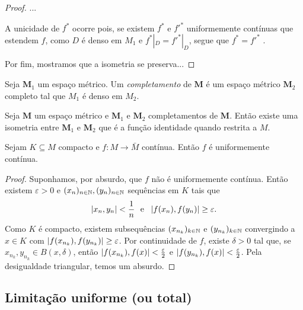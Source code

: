 \begin{proof}
...

	A unicidade de $f^*$ ocorre pois, se existem $f^*$ e $f'^*$ uniformemente contínuas que estendem $f$, como $D$ é denso em $M_1$ e $f^*|_D = f'^*|_D$, segue que $f^* = f'^*$ .

	Por fim, mostramos que a isometria se preserva...
\end{proof}

\begin{definition}
Seja $\bm M_1$  um espaço métrico. Um \emph{completamento} de $\bm M$ é um espaço métrico $\bm M_2$ completo tal que $M_1$ é denso em $M_2$.
\end{definition}

\begin{exercise}
Seja $\bm M$ um espaço métrico e $\bm M_1$ e $\bm M_2$ completamentos de $\bm M$. Então existe uma isometria entre $\bm M_1$ e $\bm M_2$ que é a função identidade quando restrita a $M$.
\end{exercise}
%


\begin{proposition}
Sejam $K \subseteq M$ compacto e $f: M \to \bar M$ contínua. Então $f$ é uniformemente contínua.
\end{proposition}
\begin{proof}
Suponhamos, por absurdo, que $f$ não é uniformemente contínua. Então existem $\varepsilon > 0$ e $(x_n)_{n \in \mathbb{N}},(y_n)_{n \in \mathbb{N}}$ sequências em $K$ tais que
	\begin{equation*}
	\left\vert{x_n},{y_n}\right\vert < \frac{1}{n} \text{\ \ e\ \ } \left\vert{f(x_n)},{f(y_n)}\right\vert \geq \varepsilon.
	\end{equation*}
Como $K$ é compacto, existem subsequências $(x_{n_k})_{k \in \mathbb{N}}$  e $(y_{n_k})_{k \in \mathbb{N}}$ convergindo a $x \in K$ com $\left\vert{f(x_{n_k})},{f(y_{n_k})}\right\vert \geq \varepsilon$. Por continuidade de $f$, existe $\delta > 0$ tal que, se $x_{n_k},y_{n_k} \in B(x,\delta)$, então $\left\vert{f(x_{n_k})},{f(x)}\right\vert < \frac{\varepsilon}{2}$ e $\left\vert{f(y_{n_k})},{f(x)}\right\vert < \frac{\varepsilon}{2}$. Pela desigualdade triangular, temos um absurdo.
\end{proof}


\subsection{Limitação uniforme (ou total)}

